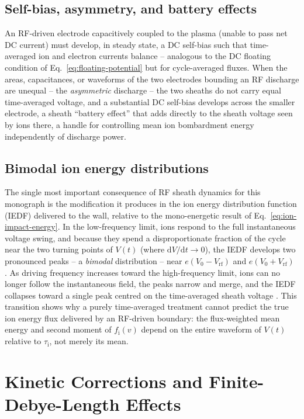 \subsection{Self-bias, asymmetry, and battery effects}

An RF-driven electrode capacitively coupled to the plasma (unable to pass net DC current) must develop, in steady state, a DC self-bias such that time-averaged ion and electron currents balance -- analogous to the DC floating condition of Eq.~\eqref{eq:floating-potential} but for cycle-averaged fluxes. When the areas, capacitances, or waveforms of the two electrodes bounding an RF discharge are unequal -- the \emph{asymmetric} discharge -- the two sheaths do not carry equal time-averaged voltage, and a substantial DC self-bias develops across the smaller electrode, a sheath ``battery effect'' that adds directly to the sheath voltage seen by ions there, a handle for controlling mean ion bombardment energy independently of discharge power.

\subsection{Bimodal ion energy distributions}

The single most important consequence of RF sheath dynamics for this monograph is the modification it produces in the ion energy distribution function (IEDF) delivered to the wall, relative to the mono-energetic result of Eq.~\eqref{eq:ion-impact-energy}. In the low-frequency limit, ions respond to the full instantaneous voltage swing, and because they spend a disproportionate fraction of the cycle near the two turning points of $V(t)$ (where $\mathrm{d}V/\mathrm{d}t \to 0$), the IEDF develops two pronounced peaks -- a \emph{bimodal} distribution -- near $e(V_{0} - V_{\mathrm{rf}})$ and $e(V_{0}+V_{\mathrm{rf}})$ \cite{ref0055}. As driving frequency increases toward the high-frequency limit, ions can no longer follow the instantaneous field, the peaks narrow and merge, and the IEDF collapses toward a single peak centred on the time-averaged sheath voltage \cite{ref0055,ref0040}. This transition shows why a purely time-averaged treatment cannot predict the true ion energy flux delivered by an RF-driven boundary: the flux-weighted mean energy and second moment of $f_{\mathrm{i}}(v)$ depend on the entire waveform of $V(t)$ relative to $\tau_{\mathrm{i}}$, not merely its mean.

\section{Kinetic Corrections and Finite-Debye-Length Effects}

